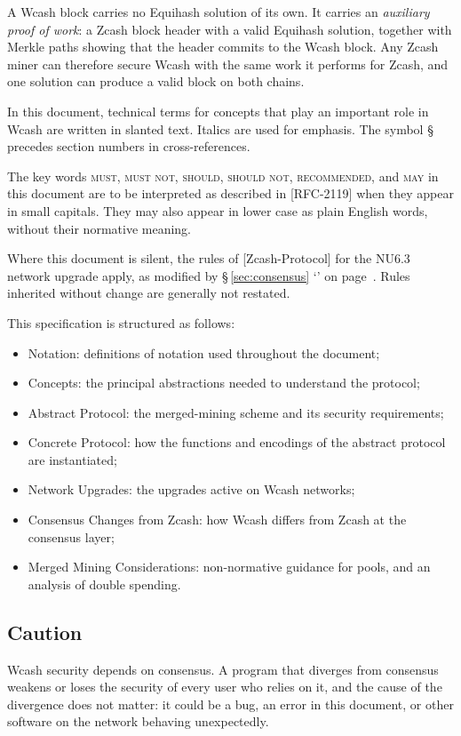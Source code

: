 \documentclass[10pt,letterpaper]{article}
\newcommand\term[1]{\textsl{#1}}
\newcommand\MUST{\textsc{must}}
\newcommand\MUSTNOT{\textsc{must not}}
\newcommand\SHOULD{\textsc{should}}
\newcommand\SHOULDNOT{\textsc{should not}}
\newcommand\MAY{\textsc{may}}
\newcommand\RECOMMENDED{\textsc{recommended}}
\newcommand\secref[1]{\S\,\ref{#1} `\nameref{#1}' on page~\pageref{#1}}
\theoremstyle{plain}
\begin{document}
A Wcash block carries no Equihash solution of its own. It carries an \term{auxiliary proof of work}: a Zcash block header with a valid Equihash solution, together with Merkle paths showing that the header commits to the Wcash block. Any Zcash miner can therefore secure Wcash with the same work it performs for Zcash, and one solution can produce a valid block on both chains.

In this document, technical terms for concepts that play an important role in Wcash are written in slanted text. Italics are used for emphasis. The symbol \S{} precedes section numbers in cross-references.

The key words \MUST, \MUSTNOT, \SHOULD, \SHOULDNOT, \RECOMMENDED, and \MAY{} in this document are to be interpreted as described in [RFC-2119] when they appear in small capitals. They may also appear in lower case as plain English words, without their normative meaning.

Where this document is silent, the rules of [Zcash-Protocol] for the NU6.3 network upgrade apply, as modified by \secref{sec:consensus}. Rules inherited without change are generally not restated.

This specification is structured as follows:
\begin{itemize}
\item Notation: definitions of notation used throughout the document;
\item Concepts: the principal abstractions needed to understand the protocol;
\item Abstract Protocol: the merged-mining scheme and its security requirements;
\item Concrete Protocol: how the functions and encodings of the abstract protocol are instantiated;
\item Network Upgrades: the upgrades active on Wcash networks;
\item Consensus Changes from Zcash: how Wcash differs from Zcash at the consensus layer;
\item Merged Mining Considerations: non-normative guidance for pools, and an analysis of double spending.
\end{itemize}

\subsection{Caution}\label{sec:caution}

Wcash security depends on consensus. A program that diverges from consensus weakens or loses the security of every user who relies on it, and the cause of the divergence does not matter: it could be a bug, an error in this document, or other software on the network behaving unexpectedly.
\end{document}
